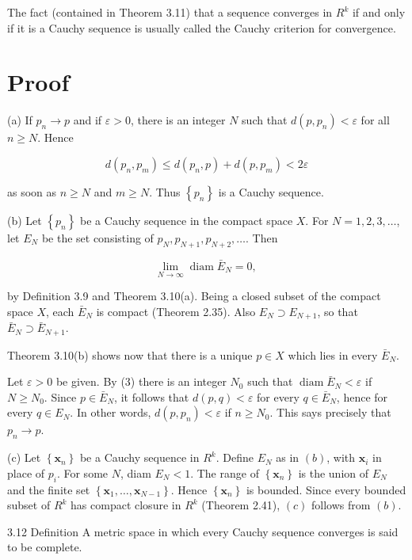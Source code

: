 \documentclass[10pt]{article}
\begin{document}
The fact (contained in Theorem 3.11) that a sequence converges in $R^{k}$ if and only if it is a Cauchy sequence is usually called the Cauchy criterion for convergence.

\section{Proof}
(a) If $p_{n} \rightarrow p$ and if $\varepsilon>0$, there is an integer $N$ such that $d\left(p, p_{n}\right)<\varepsilon$ for all $n \geq N$. Hence

$$
d\left(p_{n}, p_{m}\right) \leq d\left(p_{n}, p\right)+d\left(p, p_{m}\right)<2 \varepsilon
$$

as soon as $n \geq N$ and $m \geq N$. Thus $\left\{p_{n}\right\}$ is a Cauchy sequence.

(b) Let $\left\{p_{n}\right\}$ be a Cauchy sequence in the compact space $X$. For $N=1,2,3, \ldots$, let $E_{N}$ be the set consisting of $p_{N}, p_{N+1}, p_{N+2}, \ldots$. Then

$$
\lim _{N \rightarrow \infty} \operatorname{diam} \bar{E}_{N}=0 \text {, }
$$

by Definition 3.9 and Theorem 3.10(a). Being a closed subset of the compact space $X$, each $\bar{E}_{N}$ is compact (Theorem 2.35). Also $E_{N} \supset E_{N+1}$, so that $\bar{E}_{N} \supset \bar{E}_{N+1}$.

Theorem 3.10(b) shows now that there is a unique $p \in X$ which lies in every $\bar{E}_{N}$.

Let $\varepsilon>0$ be given. By (3) there is an integer $N_{0}$ such that $\operatorname{diam} \bar{E}_{N}<\varepsilon$ if $N \geq N_{0}$. Since $p \in \bar{E}_{N}$, it follows that $d(p, q)<\varepsilon$ for every $q \in \bar{E}_{N}$, hence for every $q \in E_{N}$. In other words, $d\left(p, p_{n}\right)<\varepsilon$ if $n \geq N_{0}$. This says precisely that $p_{n} \rightarrow p$.

(c) Let $\left\{\mathbf{x}_{n}\right\}$ be a Cauchy sequence in $R^{k}$. Define $E_{N}$ as in $(b)$, with $\mathbf{x}_{i}$ in place of $p_{i}$. For some $N$, diam $E_{N}<1$. The range of $\left\{\mathbf{x}_{n}\right\}$ is the union of $E_{N}$ and the finite set $\left\{\mathbf{x}_{1}, \ldots, \mathbf{x}_{N-1}\right\}$. Hence $\left\{\mathbf{x}_{n}\right\}$ is bounded. Since every bounded subset of $R^{k}$ has compact closure in $R^{k}$ (Theorem 2.41), $(c)$ follows from $(b)$.

3.12 Definition A metric space in which every Cauchy sequence converges is said to be complete.
\end{document}
